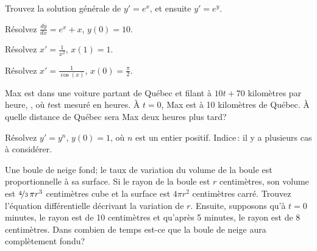 \begin{exercise}
Trouvez la solution générale de 
$y' = e^x$,  et ensuite $y' = e^y$.
\end{exercise}


\setcounter{exercise}{100}

\begin{exercise}
Résolvez $\frac{dy}{dx} = e^x + x$, $y(0) = 10$.
\end{exercise}

\begin{exercise}
Résolvez $x' = \frac{1}{x^2}$, $x(1)=1$.
\end{exercise}

\begin{exercise}
Résolvez $x' = \frac{1}{\cos(x)}$, $x(0)=\frac{\pi}{2}$.
\end{exercise}

\begin{exercise}
Max est dans une voiture partant de Québec et filant à $10t+70$ kilomètres par heure, ,
où $t$est mesuré en heures.  À $t=0$, Max est à 10 kilomètres de Québec.  À quelle distance de Québec sera Max deux heures plus tard?
\end{exercise}

\begin{exercise}
Résolvez $y' = y^n$, $y(0) = 1$, où $n$ est un entier positif.  
Indice\,: il y a plusieurs cas à considérer.
\end{exercise}

\begin{exercise}
Une boule de neige fond; le taux de variation du volume de la boule est proportionnelle à sa surface.  Si le rayon de la boule est $r$ centimètres, son volume est
$\nicefrac{4}{3}\,\pi r^3$ centimètres cube et la surface est
$4 \pi r^2$ centimètres carré.   Trouvez l'équation différentielle décrivant la variation de $r$.  Ensuite, supposons qu'à $t=0$ minutes, le rayon est de 10 centimètres et qu'après 5 minutes, le rayon est de 8 centimètres.  Dans combien de temps est-ce que la boule de neige aura complètement fondu?
\end{exercise}

